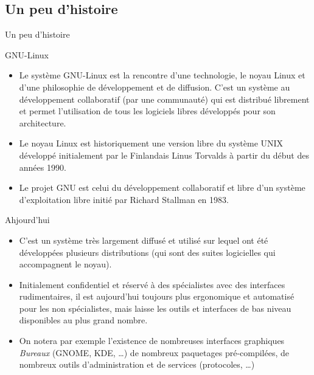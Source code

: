 \subsection{Un peu d'histoire}
\begin{frame}{Un peu d'histoire}
  \begin{block}{GNU-Linux}
    \begin{itemize}
    \item Le système GNU-Linux est la rencontre d'une technologie, le
      noyau Linux et d'une philosophie de développement et de
      diffusion. C'est un système au développement collaboratif (par une
      communauté) qui est distribué librement et permet l'utilisation de
      tous les logiciels libres développés pour son architecture.
    \item Le noyau Linux est historiquement une version libre du système
      UNIX développé initialement par le Finlandais Linus Torvalds à
      partir du début des années 1990.
    \item Le projet GNU est celui du développement collaboratif et libre
      d'un système d'exploitation libre initié par Richard Stallman en
      1983.
    \end{itemize}
  \end{block}
  \begin{block}{Ahjourd'hui}
    \begin{itemize}
    \item C'est un système très largement diffusé et utilisé sur lequel
      ont été développées plusieurs distributions (qui sont des suites
      logicielles qui accompagnent le noyau).
    \item Initialement confidentiel et réservé à des spécialistes avec
      des interfaces rudimentaires, il est aujourd'hui toujours plus
      ergonomique et automatisé pour les non spécialistes, mais laisse
      les outils et interfaces de bas niveau disponibles au plus grand
      nombre.
    \item On notera par exemple l'existence de nombreuses interfaces
      graphiques \textit{Bureaux} (GNOME, KDE, \dots) de nombreux
      paquetages pré-compilées, de nombreux outils d'administration et
      de services (protocoles, \dots)
    \end{itemize}
  \end{block}
  
\end{frame}
